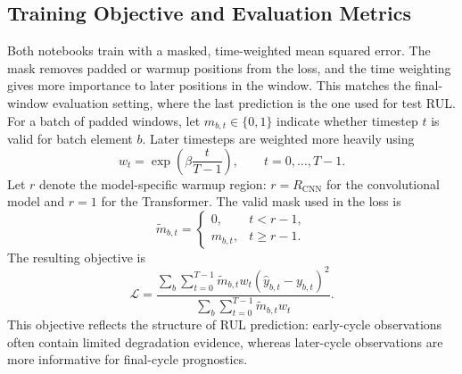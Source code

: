 \documentclass[11pt,a4paper]{article}
\begin{document}
\subsection{Training Objective and Evaluation Metrics}

Both notebooks train with a masked, time-weighted mean squared error. The mask removes padded or warmup positions from the loss, and the time weighting gives more importance to later positions in the window. This matches the final-window evaluation setting, where the last prediction is the one used for test RUL. For a batch of padded windows, let $m_{b,t} \in \{0,1\}$ indicate whether timestep $t$ is valid for batch element $b$. Later timesteps are weighted more heavily using
\begin{equation}
    w_t = \exp\left(\beta \frac{t}{T-1}\right),
    \qquad t=0,\dots,T-1.
\end{equation}
Let $r$ denote the model-specific warmup region: $r=R_{\mathrm{CNN}}$ for the convolutional model and $r=1$ for the Transformer. The valid mask used in the loss is
\begin{equation}
    \tilde{m}_{b,t} =
    \begin{cases}
        0, & t < r-1,\\
        m_{b,t}, & t \geq r-1.
    \end{cases}
\end{equation}
The resulting objective is
\begin{equation}
    \mathcal{L}
    =
    \frac{
        \sum_b \sum_{t=0}^{T-1}
        \tilde{m}_{b,t} w_t
        \left(\hat{y}_{b,t} - y_{b,t}\right)^2
    }{
        \sum_b \sum_{t=0}^{T-1}
        \tilde{m}_{b,t} w_t
    }.
\end{equation}
This objective reflects the structure of RUL prediction: early-cycle observations often contain limited degradation evidence, whereas later-cycle observations are more informative for final-cycle prognostics.
\end{document}

